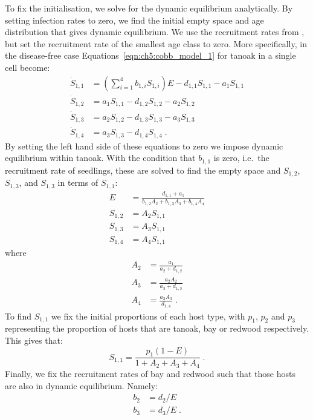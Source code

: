To fix the initialisation, we solve for the dynamic equilibrium analytically. By setting infection rates to zero, we find the initial empty space and age distribution that gives dynamic equilibrium. We use the recruitment rates from \citet{cobb_ecosystem_2012}, but set the recruitment rate of the smallest age class to zero. More specifically, in the disease-free case Equations~\ref{eqn:ch5:cobb_model_1} for tanoak in a single cell become:
\begin{subequations}
\begin{align}
    \dot{S}_{1,1} &= \left(\sum_{i=1}^4b_{1,i}S_{1,i}\right)E - d_{1,1}S_{1,1} - a_1S_{1,1}\\
    \dot{S}_{1,2} &= a_1S_{1,1} - d_{1,2}S_{1,2} - a_2S_{1,2}\\
    \dot{S}_{1,3} &= a_2S_{1,2} - d_{1,3}S_{1,3} - a_3S_{1,3}\\
    \dot{S}_{1,4} &= a_3S_{1,3} - d_{1,4}S_{1,4} \;.
\end{align}
\end{subequations}
By setting the left hand side of these equations to zero we impose dynamic equilibrium within tanoak. With the condition that $b_{1,1}$ is zero, i.e.\ the recruitment rate of seedlings, these are solved to find the empty space and $S_{1,2}$, $S_{1,3}$, and $S_{1,3}$ in terms of $S_{1,1}$:
\begin{subequations}\label{eqn:ch5:tan_init}
    \begin{align}
        E &= \frac{d_{1,1} + a_1}{b_{1,2}A_2 + b_{1,3}A_3 + b_{1,4}A_4}\\
        S_{1,2} &= A_2S_{1,1}\\
        S_{1,3} &= A_3S_{1,1}\\
        S_{1,4} &= A_4S_{1,1}
    \end{align}
    \end{subequations}
where
\begin{subequations}
\begin{align}
    A_2 &= \frac{a_1}{a_2+d_{1,2}}\\
    A_3 &= \frac{a_2A_2}{a_3+d_{1,3}}\\
    A_4 &= \frac{a_3A_3}{d_{1,4}}\;.
\end{align}
\end{subequations}
To find $S_{1,1}$ we fix the initial proportions of each host type, with $p_1$, $p_2$ and $p_3$ representing the proportion of hosts that are tanoak, bay or redwood respectively. This gives that:
\begin{equation}
    \label{eqn:ch5:tan_0_init}
    S_{1,1} = \frac{p_1(1-E)}{1+A_2+A_3+A_4}\;.
\end{equation}
Finally, we fix the recruitment rates of bay and redwood such that those hosts are also in dynamic equilibrium. Namely:
\begin{subequations}
\begin{align}
    b_2 &= d_2 / E \\
    b_3 &= d_3 / E \;.
\end{align}
\end{subequations}

